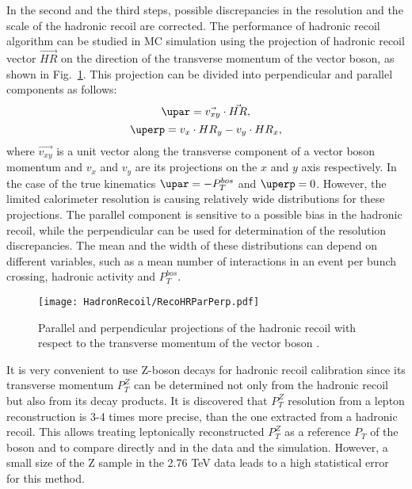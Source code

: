 In the second and the third steps, possible discrepancies in the resolution and the scale of the hadronic recoil are corrected. The performance of hadronic recoil algorithm can be studied in MC simulation using the projection of hadronic recoil vector $\vec{HR}$ on the direction of the transverse momentum of the vector boson, as shown in Fig.~\ref{ris:HadrRecoilTruthPt}. This projection can be divided into perpendicular \uperp and parallel \upar components as follows:
\begin{equation}
\upar=\vec{v_{xy}}\cdot\vec{HR},
\end{equation}
\begin{equation}
\uperp=v_x\cdot HR_y - v_y \cdot HR_x,
\end{equation}
where $\vec{v_{xy}}$ is a unit vector along the transverse component of a vector boson momentum and $v_x$ and $v_y$ are its projections on the $x$ and $y$ axis respectively. In the case of the true kinematics $\upar=-P_T^{bos}$ and $\uperp = 0$. However, the limited calorimeter resolution is causing relatively wide distributions for these projections. The parallel component \upar is sensitive to a possible bias in the hadronic recoil, while the perpendicular \uperp can be used for determination of the resolution discrepancies. The mean and the width of these distributions can depend on different variables, such as a mean number of interactions in an event per bunch crossing, hadronic activity and $P_{T}^{bos}$. 


\begin{figure}[!tbp]
\begin{center}
\begin{minipage}[h]{0.49\linewidth}
\texttt{[image: HadronRecoil/RecoHRParPerp.pdf]}
\end{minipage}
\caption{Parallel and perpendicular projections of the hadronic recoil with respect to the transverse momentum of the vector boson \cite{HRPlots}.}
\label{ris:HadrRecoilTruthPt}
\end{center}
\end{figure}

It is very convenient to use Z-boson decays for hadronic recoil calibration since its transverse momentum $P_T^Z$ can be determined not only from the hadronic recoil but also from its decay products.  It is discovered that $P_T^Z$ resolution from a lepton reconstruction is 3-4 times more precise, than the one extracted from a hadronic recoil. This allows treating leptonically reconstructed $P_T^{Z}$ as a reference $P_T$ of the boson and to compare directly \uperp and \upar in the data and the simulation. However, a small size of the Z sample in the 2.76 TeV data leads to a high statistical error for this method. 

